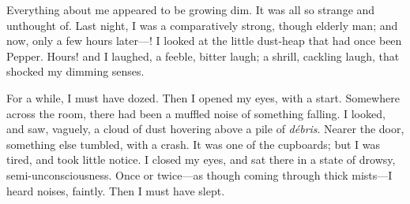 Everything about me appeared to be growing dim. It was all so strange and unthought of. Last night, I was a comparatively strong, though elderly man; and now, only a few hours later---! I looked at the little dust-heap that had once been Pepper. Hours! and I laughed, a feeble, bitter laugh; a shrill, cackling laugh, that shocked my dimming senses.

For a while, I must have dozed. Then I opened my eyes, with a start. Somewhere across the room, there had been a muffled noise of something falling. I looked, and saw, vaguely, a cloud of dust hovering above a pile of \textit{débris}. Nearer the door, something else tumbled, with a crash. It was one of the cupboards; but I was tired, and took little notice. I closed my eyes, and sat there in a state of drowsy, semi-unconsciousness. Once or twice---as though coming through thick mists---I heard noises, faintly. Then I must have slept.

\clearpage

